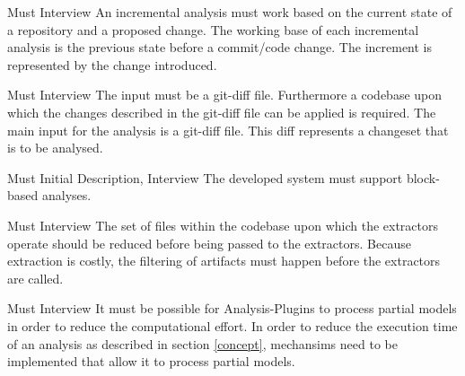 \documentclass[a4paper]{article}
\begin{document}
\begin{req}
	\reqtable
	{Must}  {Interview}
	{An incremental analysis must work based on the current state of a repository and a proposed change. }
	{The working base of each incremental analysis is the previous state before a commit/code change. The increment is represented by the change introduced.}
	
	\begin{subreq} \label{req:git-diff}
		\reqtable
		{Must}  {Interview}
		{The input must be a git-diff file. Furthermore a codebase upon which the changes described in the git-diff file can be applied is required.}
		{The main input for the analysis is a git-diff file. This diff represents a changeset that is to be analysed.}
	\end{subreq}
\end{req}

\begin{req}
	\reqtable
	{Must}  {Initial Description, Interview}
	{The developed system must support block-based analyses. }
	{}
	
\end{req}


\begin{req} \label{req:early-filtering}
\reqtable
	{Must}  {Interview}
	{The set of files within the codebase upon which the extractors operate should be reduced before being passed to the extractors.}
	{Because extraction is costly, the filtering of artifacts must happen before the extractors are called.}
\end{req}

\begin{req} \label{req:early-filtering}
\reqtable
	{Must}  {Interview}
	{It must be possible for Analysis-Plugins to process partial models in order to reduce the computational effort.}
	{In order to reduce the execution time of an analysis as described in section \ref{concept}, mechansims need to be implemented that allow it to process partial models.}
\end{req}
\end{document}
